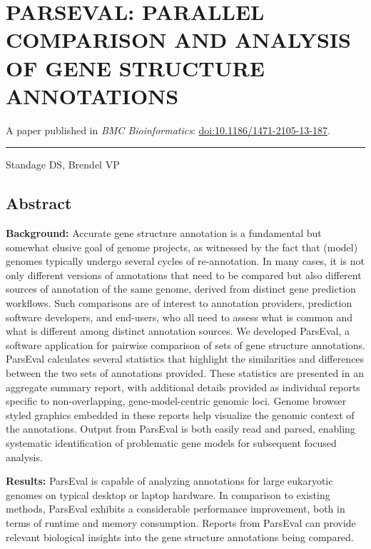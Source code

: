 \chapter{PARSEVAL: PARALLEL COMPARISON AND ANALYSIS OF GENE STRUCTURE ANNOTATIONS}

A paper published in \textit{BMC Bioinformatics}: \href{http://dx.doi.org/10.1186/1471-2105-13-187}{doi:10.1186/1471-2105-13-187}.

\noindent\hfil\rule{0.5\textwidth}{.4pt}\hfil

Standage DS, Brendel VP

\section{Abstract}

\noindent \textbf{Background:} Accurate gene structure annotation is a fundamental but somewhat elusive goal of genome projects, as witnessed by the fact that (model) genomes typically undergo several cycles of re-annotation.
In many cases, it is not only different versions of annotations that need to be compared but also different sources of annotation of the same genome, derived from distinct gene prediction workflows.
Such comparisons are of interest to annotation providers, prediction software developers, and end-users, who all need to assess what is common and what is different among distinct annotation sources.
We developed ParsEval, a software application for pairwise comparison of sets of gene structure annotations.
ParsEval calculates several statistics that highlight the similarities and differences between the two sets of annotations provided.
These statistics are presented in an aggregate summary report, with additional details provided as individual reports specific to non-overlapping, gene-model-centric genomic loci.
Genome browser styled graphics embedded in these reports help visualize the genomic context of the annotations.
Output from ParsEval is both easily read and parsed, enabling systematic identification of problematic gene models for subsequent focused analysis.

\noindent \textbf{Results:} ParsEval is capable of analyzing annotations for large eukaryotic genomes on typical desktop or laptop hardware.
In comparison to existing methods, ParsEval exhibits a considerable performance improvement, both in terms of runtime and memory consumption.
Reports from ParsEval can provide relevant biological insights into the gene structure annotations being compared.

